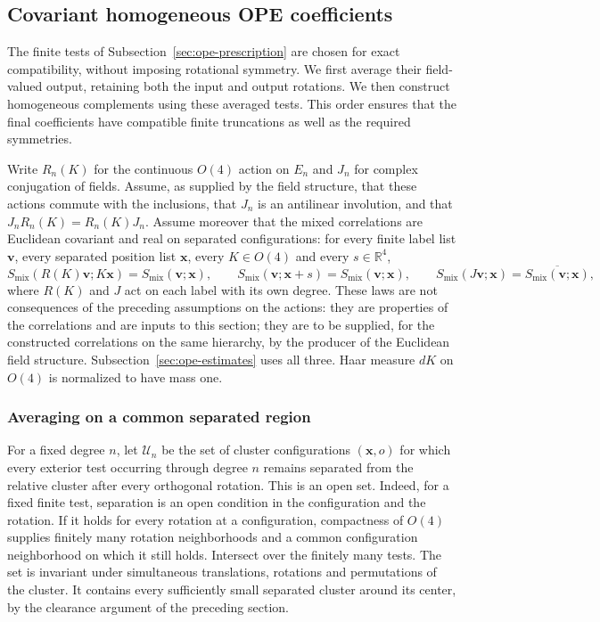 \subsection{Covariant homogeneous OPE coefficients}
\label{sec:ope-homogeneous}
The finite tests of Subsection~\ref{sec:ope-prescription} are chosen for exact
compatibility, without imposing rotational symmetry. We first average
their field-valued output, retaining both the input and output rotations.
We then construct homogeneous complements using these averaged tests.
This order ensures that the final coefficients have compatible finite
truncations as well as the required symmetries.

Write $R_n(K)$ for the continuous $O(4)$ action on $E_n$ and $J_n$ for
complex conjugation of fields. Assume, as supplied by the field structure,
that these actions commute with the inclusions, that $J_n$ is an antilinear
involution, and that $J_nR_n(K)=R_n(K)J_n$. Assume moreover that the
mixed correlations are Euclidean covariant and real on separated
configurations: for every finite label list $\boldsymbol v$, every
separated position list $\boldsymbol x$, every $K\in O(4)$ and every
$s\in\mathbb R^4$,
\begin{equation}\label{eq:ope-mixed-covariance}
 S_{\mathrm{mix}}(R(K)\boldsymbol v;K\boldsymbol x)
  =S_{\mathrm{mix}}(\boldsymbol v;\boldsymbol x),\qquad
 S_{\mathrm{mix}}(\boldsymbol v;\boldsymbol x+s)
  =S_{\mathrm{mix}}(\boldsymbol v;\boldsymbol x),\qquad
 S_{\mathrm{mix}}(J\boldsymbol v;\boldsymbol x)
  =\overline{S_{\mathrm{mix}}(\boldsymbol v;\boldsymbol x)},
\end{equation}
where $R(K)$ and $J$ act on each label with its own degree. These laws are
not consequences of the preceding assumptions on the actions: they are
properties of the correlations and are inputs to this section; they are
to be supplied, for the constructed correlations on the same hierarchy,
by the producer of the Euclidean field structure.
Subsection~\ref{sec:ope-estimates} uses all three. Haar measure
$dK$ on $O(4)$ is normalized to have mass one.

\subsubsection{Averaging on a common separated region}
For a fixed degree $n$, let $\mathcal U_n$ be the set of cluster configurations
$(\boldsymbol x,o)$ for which every exterior test occurring through degree
$n$ remains separated from the relative cluster after every orthogonal
rotation. This is an open set. Indeed, for a fixed finite test, separation
is an open condition in the configuration and the rotation. If it holds
for every rotation at a configuration, compactness of $O(4)$ supplies
finitely many rotation neighborhoods and a common configuration neighborhood
on which it still holds. Intersect over the finitely many tests.
The set is invariant under simultaneous translations, rotations and
permutations of the cluster. It contains every sufficiently small separated
cluster around its center, by the clearance argument of the preceding
section.

